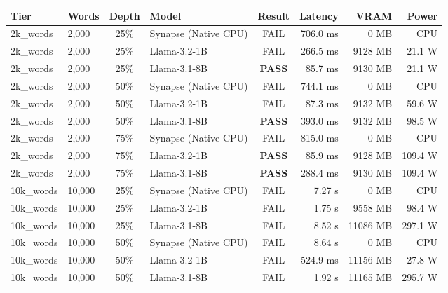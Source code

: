 {\scriptsize\sffamily\renewcommand{\arraystretch}{0.88}
\setlength{\tabcolsep}{3.5pt}
\noindent\begin{longtable}{p{1.6cm} p{1.6cm} c p{3.4cm} c r r r}
\toprule
\textbf{\color{brandnavy}Tier} & \textbf{\color{brandnavy}Words} & \textbf{\color{brandnavy}Depth} & \textbf{\color{brandnavy}Model} & \textbf{\color{brandnavy}Result} & \textbf{\color{brandnavy}Latency} & \textbf{\color{brandnavy}VRAM} & \textbf{\color{brandnavy}Power} \\
\midrule
\endhead
\bottomrule
\endfoot
2k\_words & 2,000 & 25\% & Synapse (Native CPU) & \color{gray}FAIL & 706.0 ms & 0 MB & CPU \\
2k\_words & 2,000 & 25\% & Llama-3.2-1B & \color{gray}FAIL & 266.5 ms & 9128 MB & 21.1 W \\
2k\_words & 2,000 & 25\% & Llama-3.1-8B & \textbf{\color{passgreen}PASS} & 85.7 ms & 9130 MB & 21.1 W \\
2k\_words & 2,000 & 50\% & Synapse (Native CPU) & \color{gray}FAIL & 744.1 ms & 0 MB & CPU \\
2k\_words & 2,000 & 50\% & Llama-3.2-1B & \color{gray}FAIL & 87.3 ms & 9132 MB & 59.6 W \\
2k\_words & 2,000 & 50\% & Llama-3.1-8B & \textbf{\color{passgreen}PASS} & 393.0 ms & 9132 MB & 98.5 W \\
2k\_words & 2,000 & 75\% & Synapse (Native CPU) & \color{gray}FAIL & 815.0 ms & 0 MB & CPU \\
2k\_words & 2,000 & 75\% & Llama-3.2-1B & \textbf{\color{passgreen}PASS} & 85.9 ms & 9128 MB & 109.4 W \\
2k\_words & 2,000 & 75\% & Llama-3.1-8B & \textbf{\color{passgreen}PASS} & 288.4 ms & 9130 MB & 109.4 W \\
10k\_words & 10,000 & 25\% & Synapse (Native CPU) & \color{gray}FAIL & 7.27 s & 0 MB & CPU \\
10k\_words & 10,000 & 25\% & Llama-3.2-1B & \color{gray}FAIL & 1.75 s & 9558 MB & 98.4 W \\
10k\_words & 10,000 & 25\% & Llama-3.1-8B & \color{gray}FAIL & 8.52 s & 11086 MB & 297.1 W \\
10k\_words & 10,000 & 50\% & Synapse (Native CPU) & \color{gray}FAIL & 8.64 s & 0 MB & CPU \\
10k\_words & 10,000 & 50\% & Llama-3.2-1B & \color{gray}FAIL & 524.9 ms & 11156 MB & 27.8 W \\
10k\_words & 10,000 & 50\% & Llama-3.1-8B & \color{gray}FAIL & 1.92 s & 11165 MB & 295.7 W \\

\end{longtable}}
